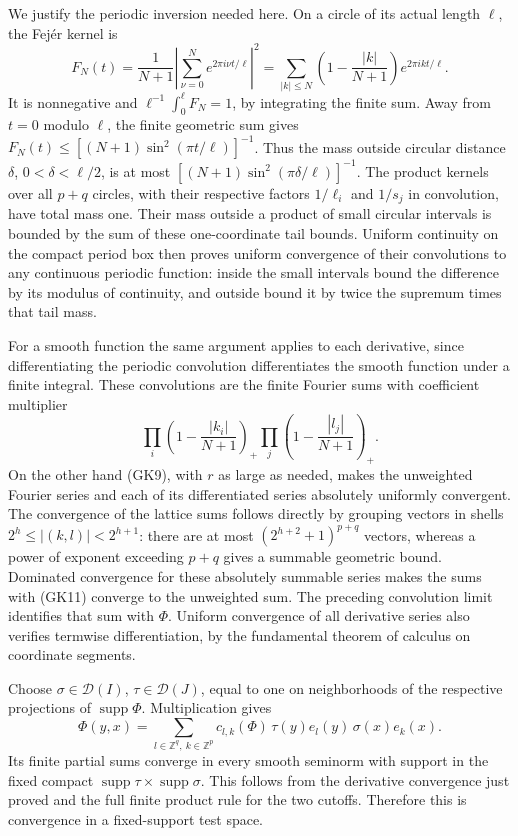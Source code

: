 \documentclass[
  11pt,
]{article}
\begin{document}
We justify the periodic inversion needed here. On a circle of its actual
length \(\ell\), the Fejér kernel is \[
 F_N(t)=\frac1{N+1}\left|\sum_{\nu=0}^N e^{2\pi i\nu t/\ell}\right|^2
 =\sum_{|k|\leq N}\left(1-\frac{|k|}{N+1}\right)e^{2\pi ikt/\ell}.
 \tag{GK10}
\] It is nonnegative and \(\ell^{-1}\int_0^\ell F_N=1\), by integrating
the finite sum. Away from \(t=0\) modulo \(\ell\), the finite geometric
sum gives \(F_N(t)\leq[(N+1)\sin^2(\pi t/\ell)]^{-1}\). Thus the mass
outside circular distance \(\delta\), \(0<\delta<\ell/2\), is at most
\([(N+1)\sin^2(\pi\delta/\ell)]^{-1}\). The product kernels over all
\(p+q\) circles, with their respective factors \(1/\ell_i\) and
\(1/s_j\) in convolution, have total mass one. Their mass outside a
product of small circular intervals is bounded by the sum of these
one-coordinate tail bounds. Uniform continuity on the compact period box
then proves uniform convergence of their convolutions to any continuous
periodic function: inside the small intervals bound the difference by
its modulus of continuity, and outside bound it by twice the supremum
times that tail mass.

For a smooth function the same argument applies to each derivative,
since differentiating the periodic convolution differentiates the smooth
function under a finite integral. These convolutions are the finite
Fourier sums with coefficient multiplier \[
 \prod_i\left(1-\frac{|k_i|}{N+1}\right)_+
 \prod_j\left(1-\frac{|l_j|}{N+1}\right)_+ .
 \tag{GK11}
\] On the other hand (GK9), with \(r\) as large as needed, makes the
unweighted Fourier series and each of its differentiated series
absolutely uniformly convergent. The convergence of the lattice sums
follows directly by grouping vectors in shells
\(2^h\leq|(k,l)|<2^{h+1}\): there are at most \((2^{h+2}+1)^{p+q}\)
vectors, whereas a power of exponent exceeding \(p+q\) gives a summable
geometric bound. Dominated convergence for these absolutely summable
series makes the sums with (GK11) converge to the unweighted sum. The
preceding convolution limit identifies that sum with \(\Phi\). Uniform
convergence of all derivative series also verifies termwise
differentiation, by the fundamental theorem of calculus on coordinate
segments.

Choose \(\sigma\in\mathcal D(I)\), \(\tau\in\mathcal D(J)\), equal to
one on neighborhoods of the respective projections of
\(\operatorname{supp}\Phi\). Multiplication gives \[
 \Phi(y,x)=\sum_{l\in\mathbb Z^q,\ k\in\mathbb Z^p}
       c_{l,k}(\Phi)\,\tau(y)e_l(y)\,\sigma(x)e_k(x).
 \tag{GK12}
\] Its finite partial sums converge in every smooth seminorm with
support in the fixed compact
\(\operatorname{supp}\tau\times\operatorname{supp}\sigma\). This follows
from the derivative convergence just proved and the full finite product
rule for the two cutoffs. Therefore this is convergence in a
fixed-support test space.
\end{document}
